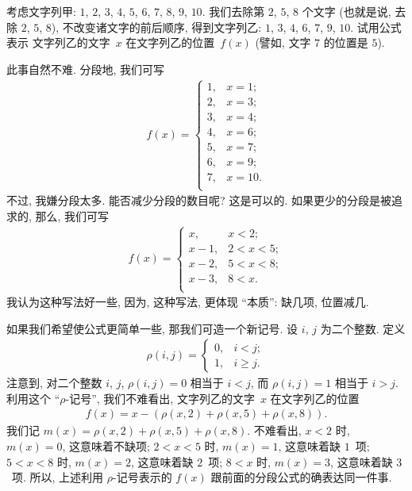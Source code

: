 \documentclass[%
    UTF8,%
    fontset=none,%
    punct=kaiming,%
    zihao=-4,%
    a4paper,%
    oneside,%
]{ctexbook}
\let\emph\relax
\renewcommand*{\geq}{\geqslant}
\begin{document}
\begin{example}
    考虑文字列甲:
    \(1\), \(2\), \(3\), \(4\), \(5\),
    \(6\), \(7\), \(8\), \(9\), \(10\).
    我们去除第 \(2\), \(5\), \(8\) 个文字
    (也就是说, 去除 \(2\), \(5\), \(8\)),
    不改变诸文字的前后顺序,
    得到文字列乙:
    \(1\), \(3\), \(4\), \(6\), \(7\), \(9\), \(10\).
    试用公式表示%
    文字列乙的文字~\(x\) 在文字列乙的位置~\(f(x)\)
    (譬如, 文字 \(7\) 的位置是 \(5\)).

    此事自然不难.
    分段地, 我们可写
    \begin{align*}
        f(x) =
        \begin{cases}
            1, & x = 1;  \\
            2, & x = 3;  \\
            3, & x = 4;  \\
            4, & x = 6;  \\
            5, & x = 7;  \\
            6, & x = 9;  \\
            7, & x = 10. \\
        \end{cases}
    \end{align*}
    不过, 我嫌分段太多.
    能否减少分段的数目呢?
    这是可以的.
    如果更少的分段是被追求的, 那么, 我们可写
    \begin{align*}
        f(x) =
        \begin{cases}
            x,     & x < 2;     \\
            x - 1, & 2 < x < 5; \\
            x - 2, & 5 < x < 8; \\
            x - 3, & 8 < x.     \\
        \end{cases}
    \end{align*}
    我认为这种写法好一些,
    因为, 这种写法, 更体现 ``本质'':
    缺几项, 位置减几.

    如果我们希望使公式更简单一些,
    那我们可造一个新记号.
    设 \(i\), \(j\) 为二个整数.
    定义
    \begin{align*}
        \rho(i, j)
        = \begin{cases}
              0, & i < j;    \\
              1, & i \geq j.
          \end{cases}
    \end{align*}
    注意到, 对\emph{不相等的}二个整数 \(i\), \(j\),
    \(\rho(i, j) = 0\) 相当于 \(i < j\),
    而 \(\rho(i, j) = 1\) 相当于 \(i > j\).
    利用这个 ``\(\rho\)-记号'', 我们不难看出,
    文字列乙的文字~\(x\) 在文字列乙的位置
    \begin{align*}
        f(x) = x - (\rho(x, 2) + \rho(x, 5) + \rho(x, 8)).
    \end{align*}
    我们记
    \(m(x) = \rho(x, 2) + \rho(x, 5) + \rho(x, 8)\).
    不难看出, \(x < 2\) 时, \(m(x) = 0\), 这意味着不缺项;
    \(2 < x < 5\) 时, \(m(x) = 1\), 这意味着缺 \(1\)~项;
    \(5 < x < 8\) 时, \(m(x) = 2\), 这意味着缺 \(2\)~项;
    \(8 < x\) 时, \(m(x) = 3\), 这意味着缺 \(3\)~项.
    所以, 上述利用 \(\rho\)-记号表示的 \(f(x)\)
    跟前面的分段公式的确表达同一件事.


\end{example}
\end{document}
